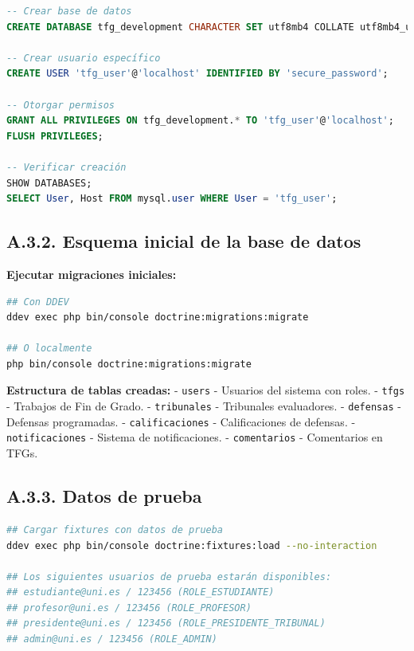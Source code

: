 \documentclass[12pt,a4paper,oneside]{report}
\providecommand{\passthrough}[1]{\texttt{#1}}
\begin{document}
\begin{lstlisting}[language=SQL]
-- Crear base de datos
CREATE DATABASE tfg_development CHARACTER SET utf8mb4 COLLATE utf8mb4_unicode_ci;

-- Crear usuario específico
CREATE USER 'tfg_user'@'localhost' IDENTIFIED BY 'secure_password';

-- Otorgar permisos
GRANT ALL PRIVILEGES ON tfg_development.* TO 'tfg_user'@'localhost';
FLUSH PRIVILEGES;

-- Verificar creación
SHOW DATABASES;
SELECT User, Host FROM mysql.user WHERE User = 'tfg_user';
\end{lstlisting}

\subsection{A.3.2. Esquema inicial de la base de
datos}\label{a.3.2.-esquema-inicial-de-la-base-de-datos}

\textbf{Ejecutar migraciones iniciales:}

\begin{lstlisting}[language=bash]
## Con DDEV
ddev exec php bin/console doctrine:migrations:migrate

## O localmente
php bin/console doctrine:migrations:migrate
\end{lstlisting}

\textbf{Estructura de tablas creadas:} - \passthrough{\lstinline!users!}
- Usuarios del sistema con roles. - \passthrough{\lstinline!tfgs!} -
Trabajos de Fin de Grado. - \passthrough{\lstinline!tribunales!} -
Tribunales evaluadores. - \passthrough{\lstinline!defensas!} - Defensas
programadas. - \passthrough{\lstinline!calificaciones!} - Calificaciones
de defensas. - \passthrough{\lstinline!notificaciones!} - Sistema de
notificaciones. - \passthrough{\lstinline!comentarios!} - Comentarios en
TFGs.

\subsection{A.3.3. Datos de prueba}\label{a.3.3.-datos-de-prueba}

\begin{lstlisting}[language=bash]
## Cargar fixtures con datos de prueba
ddev exec php bin/console doctrine:fixtures:load --no-interaction

## Los siguientes usuarios de prueba estarán disponibles:
## estudiante@uni.es / 123456 (ROLE_ESTUDIANTE)
## profesor@uni.es / 123456 (ROLE_PROFESOR)
## presidente@uni.es / 123456 (ROLE_PRESIDENTE_TRIBUNAL)
## admin@uni.es / 123456 (ROLE_ADMIN)
\end{lstlisting}
\end{document}
